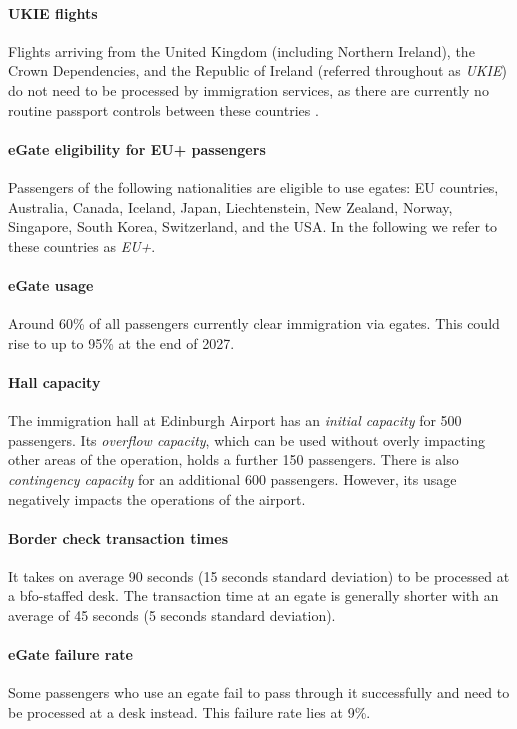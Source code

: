 \documentclass[10pt]{article}
\begin{document}
\paragraph{UKIE flights} Flights arriving from the United Kingdom (including Northern Ireland), the Crown Dependencies, and the Republic of Ireland (referred throughout as \textit{UKIE}) do not need to be processed by immigration services, as there are currently no routine passport controls between these countries \cite{common_travel_area}.

\paragraph{eGate eligibility for EU+ passengers}
Passengers of the following nationalities are eligible to use \glspl{egate}: EU countries, Australia, Canada, Iceland, Japan, Liechtenstein, New Zealand, Norway, Singapore, South Korea, Switzerland, and the USA. In the following we refer to these countries as \textit{EU+}. 

\paragraph{eGate usage}
Around 60\% of all passengers currently clear immigration via \glspl{egate}. This could rise to up to 95\% at the end of 2027.

\paragraph{Hall capacity}
The immigration hall at Edinburgh Airport has an \textit{initial capacity} for 500 passengers. Its \textit{overflow capacity}, which can be used without overly impacting other areas of the operation, holds a further 150 passengers. There is also \textit{contingency capacity} for an additional 600 passengers. However, its usage negatively impacts the operations of the airport.

\paragraph{Border check transaction times} It takes on average 90 seconds (15 seconds standard deviation) to be processed at a \gls{bfo}-staffed desk. The transaction time at an \gls{egate} is generally shorter with an average of 45 seconds (5 seconds standard deviation). 

\paragraph{eGate failure rate}
Some passengers who use an \gls{egate} fail to pass through it successfully and need to be processed at a desk instead. This failure rate lies at 9\%.
\end{document}
